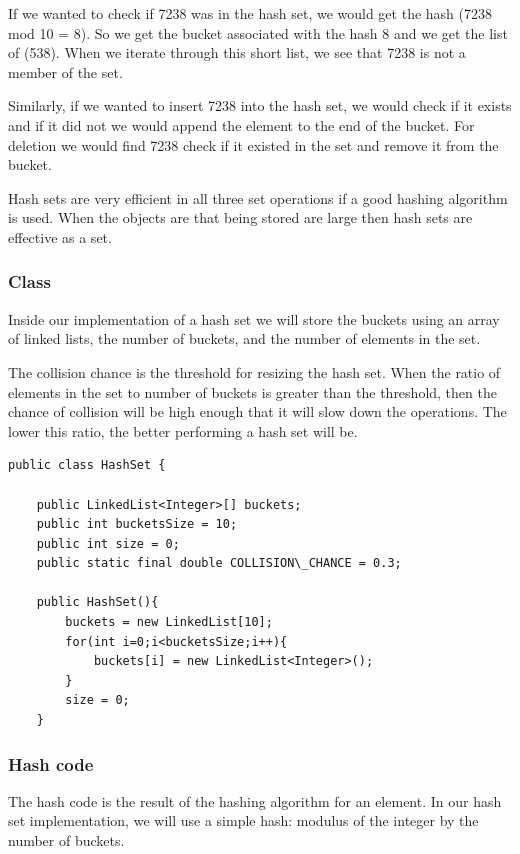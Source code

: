 \documentclass[11pt,oneside]{book}
\begin{document}
If we wanted to check if 7238 was in the hash set, we would get the hash (7238 mod 10 = 8). So we get the bucket associated with the hash 8 and we get the list of (538). When we iterate through this short list, we see that 7238 is not a member of the set.

Similarly, if we wanted to insert 7238 into the hash set, we would check if it exists and if it did not we would append the element to the end of the bucket. For deletion we would find 7238 check if it existed in the set and remove it from the bucket.

Hash sets are very efficient in all three set operations if a good hashing algorithm is used. When the objects are that being stored are large then hash sets are effective as a set.

\subsubsection{Class}

Inside our implementation of a hash set we will store the buckets using an array of linked lists, the number of buckets, and the number of elements in the set.

The collision chance is the threshold for resizing the hash set. When the ratio of elements in the set to number of buckets is greater than the threshold, then the chance of collision will be high enough that it will slow down the operations. The lower this ratio, the better performing a hash set will be.

\begin{lstlisting}
public class HashSet {

    public LinkedList<Integer>[] buckets;
    public int bucketsSize = 10;
    public int size = 0;
    public static final double COLLISION\_CHANCE = 0.3;
    
    public HashSet(){
        buckets = new LinkedList[10];
        for(int i=0;i<bucketsSize;i++){
            buckets[i] = new LinkedList<Integer>();
        }
        size = 0;
    }
\end{lstlisting}

\subsubsection{Hash code}

The hash code is the result of the hashing algorithm for an element. In our hash set implementation, we will use a simple hash: modulus of the integer by the number of buckets.
\end{document}

